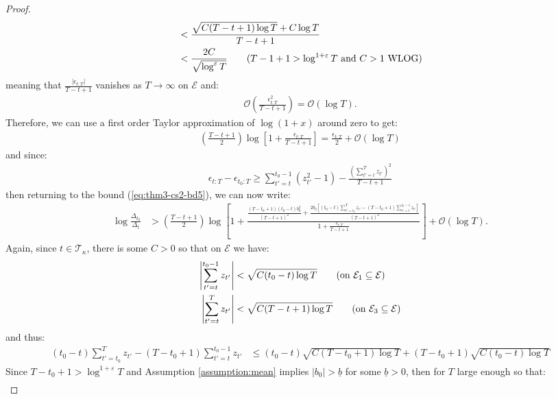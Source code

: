 \begin{proof}
\begin{align*}
    &<\frac{\sqrt{C(T-t+1)\log T} + C\log T}{T-t+1} \\
    &< \frac{2C}{\sqrt{\log^{\varepsilon}T}} \tag{$T-1+1 > \log^{1+\varepsilon} T$ and $C > 1$ WLOG}
\end{align*}
meaning that $\frac{|\epsilon_{t:T}|}{T-t+1}$ vanishes as $T\to\infty$ on $\mathcal{E}$ and:
\begin{align*}
     \mathcal{O}\left(\frac{\epsilon_{t:T}^2}{T-t+1}\right) = \mathcal{O}\left(\log T\right).
\end{align*}
Therefore, we can use a first order Taylor approximation of $\log(1+x)$ around zero to get: 
\begin{align*}
    \left(\frac{T - t +1}{2}\right)\log\left[1 + \frac{\epsilon_{t:T}}{T-t+1}\right] = \frac{\epsilon_{t:T}}{2} + \mathcal{O}\left(\log T\right)
\end{align*}
and since:
\begin{align*}
    \epsilon_{t:T} - \epsilon_{t_0:T} \geq \sum_{t' = t}^{t_0 - 1} (z_{t'}^2-1) - \frac{\left(\sum_{t'=t}^T z_{t'}\right)^2}{T-t+1}
\end{align*}
then returning to the bound (\ref{eq:thm3-cs2-bd5}), we can now write:
\begin{align}
    \log \frac{\Delta_{t_0}}{\Delta_t} &> \left(\frac{T - t +1}{2}\right)\log\left[1 +\frac{\frac{(T-t_0+1)(t_0-t)b_0^2}{(T-t+1)^2} + \frac{2b_0\left[(t_0-t)\sum_{t'=t_0}^{T} z_{t'} - (T-t_0+1)\sum_{t'=t}^{t_0-1} z_{t'}\right]}{(T-t+1)^2}}{1 + \frac{\epsilon_{t:T}}{T-t+1}} \right]   + \mathcal{O}(\log T). \label{eq:thm3-cs2-bd6}
\end{align}
Again, since $t\in\mathcal{T}_\kappa$, there is some $C>0$ so that on $\mathcal{E}$ we have:
\begin{align*}
    \left|\sum_{t'=t}^{t_0-1} z_{t'}\right| &< \sqrt{C(t_0-t)\log T} \tag{on $\mathcal{E}_1 \subseteq \mathcal{E}$} \\
    \left|\sum_{t'=t}^{T} z_{t'} \right|&< \sqrt{C(T-t+1)\log T} \tag{on $\mathcal{E}_3 \subseteq \mathcal{E}$}
\end{align*}
and thus:
\begin{align*}
    (t_0-t)\sum_{t'=t_0}^{T} z_{t'} - (T-t_0+1)\sum_{t'=t}^{t_0-1} z_{t'} &\leq (t_0-t)\sqrt{C(T-t_0+1)\log T} + (T-t_0+1)\sqrt{C(t_0-t)\log T}
\end{align*}
Since $T-t_0+1 > \log^{1+\varepsilon} T$ and Assumption \ref{assumption:mean} implies $|b_0| > \underline{b}$ for some $\underline{b} > 0$, then for $T$ large enough so that:
\begin{align*}

\end{align*}
\end{proof}
